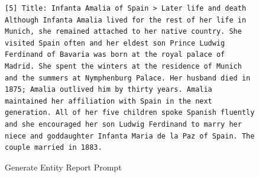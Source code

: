 \documentclass[11pt]{article}
\begin{document}
\begin{figure}[htb]
\begin{lstlisting}
[5] Title: Infanta Amalia of Spain > Later life and death
Although Infanta Amalia lived for the rest of her life in Munich, she remained attached to her native country. She visited Spain often and her eldest son Prince Ludwig Ferdinand of Bavaria was born at the royal palace of Madrid. She spent the winters at the residence of Munich and the summers at Nymphenburg Palace. Her husband died in 1875; Amalia outlived him by thirty years. Amalia maintained her affiliation with Spain in the next generation. All of her five children spoke Spanish fluently and she encouraged her son Ludwig Ferdinand to marry her niece and goddaughter Infanta Maria de la Paz of Spain. The couple married in 1883.

\end{lstlisting}

\caption{Generate Entity Report Prompt}
\label{lst:generate_entity_report}
\end{figure}
\end{document}
